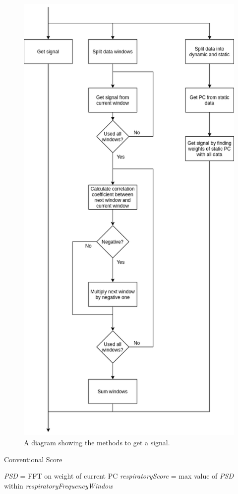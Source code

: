                 \begin{figure}
                    \centering
                    
                    \includegraphics[width=0.7\linewidth]{figures/data_driven_surrogate_signal_extraction_methods_1_get_signal.png}
                    
                    \captionsetup{singlelinecheck=false}
                    \caption{
                        A diagram showing the methods to get a signal.
                    }
                    \label{fig:pca_data_driven_surrogate_signal_extraction_methods_for_dynamic_pet_methods_get_signal}
                \end{figure}
                
                \begin{algorithm}
                    \caption{Conventional Score}
                    \;
                    \textit{PSD} = \gls{FFT} on weight of current \gls{PC}\;
                    \;
                    \textit{respiratoryScore} = max value of \textit{PSD}  within \textit{respiratoryFrequencyWindow}\;
                    \;
        
                    \label{alg:pca_data_driven_surrogate_signal_extraction_methods_for_dynamic_pet_methods_conventional_pca_conventional_score_pseudo_code}
                \end{algorithm}
                
